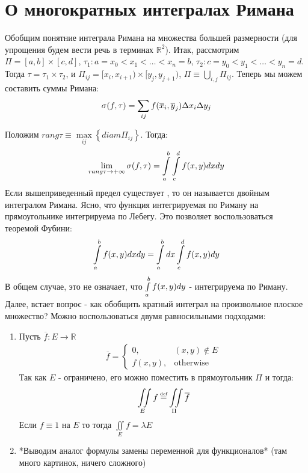 \section{О многократных интегралах Римана}

Обобщим понятние интеграла Римана на множества большей размерности 
(для упрощения будем вести речь в терминах $\mathbb{R}^2$).
Итак, рассмотрим $\Pi = [a, b] \times [c, d]$, $\tau_1 : a = x_0 < x_1 < \dots < x_n = b$, 
$\tau_2 : c = y_0 < y_1 < \dots < y_n = d$. 
Тогда $\tau = \tau_1 \times \tau_2$, и 
$\Pi_{ij} = [x_i, x_{i + 1}) \times [y_j, y_{j + 1})$, $\Pi \equiv \bigcup\limits_{i, j} \Pi_{ij}$.
Теперь мы можем составить суммы Римана:
\begin{gather*}
	\sigma(f, \tau) = \sum\limits_{ij} f(\overline{x}_i, \overline{y}_j)\Delta x_i	\Delta y_j
\end{gather*}

Положим $rang\tau \equiv \max\limits_{ij}\left\{ diam \Pi_{ij}\right\}$.
Тогда:
\begin{gather*}
	\lim\limits_{rang\tau\rightarrow +\infty} \sigma(f, \tau) = \int\limits_{a}^{b}\int\limits_{c}^{d}f(x, y)dxdy
\end{gather*}
Если вышеприведенный предел существует , то он называется двойным интегралом Римана. 
Ясно, что функция интегрируемая по Риману на прямоугольнике интегрируема по Лебегу. 
Это позволяет воспользоваться теоремой Фубини:
\begin{gather*}
	\int\limits_{a}^{b}f(x, y)dxdy = \int\limits_{a}^{b}dx\int\limits_{c}^{d}f(x, y)dy
\end{gather*}
В общем случае, это не означает, что $\int\limits_{a}^{b}f(x, y)dy$ - интегрируема по Риману.
Далее, встает вопрос - как обобщить кратный интеграл на произвольное плоское множество?
Можно воспользоваться двумя равносильными подходами:
\begin{enumerate}
	\item 
		Пусть $\overline{f}: E \rightarrow \mathbb{R}$
		\begin{gather*}
			\overline{f} =  \left\{\begin{matrix}
				0,& (x, y) \notin E
									\\ 
										f(x, y), &\text{otherwise}
									\end{matrix}\right.
		\end{gather*}
		Так как $E$ - ограничено, его можно поместить в прямоугольник $\Pi$ и тогда:
		\begin{gather*}
			\iint\limits_{E}f \defeq \iint\limits_{\Pi} \overline{f}
		\end{gather*}
		Если $f \equiv 1$ на $E$ то тогда
		$\iint\limits_{E}f = \lambda E$
	\item
		*Выводим аналог формулы замены переменной для функционалов* \todo (там много картинок, ничего
		сложного)
\end{enumerate}

